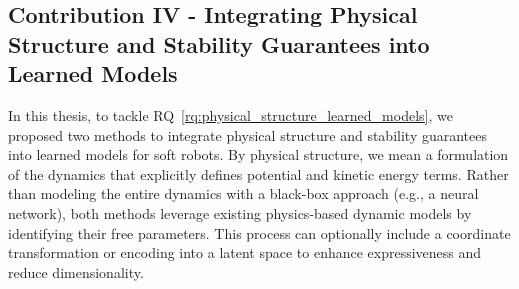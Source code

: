 \subsection{Contribution IV - Integrating Physical Structure and Stability Guarantees into Learned Models}
In this thesis, to tackle \gls{RQ}~\ref{rq:physical_structure_learned_models}, we proposed two methods to integrate physical structure and stability guarantees into learned models for soft robots. By physical structure, we mean a formulation of the dynamics that explicitly defines potential and kinetic energy terms. Rather than modeling the entire dynamics with a black-box approach (e.g., a neural network), both methods leverage existing physics-based dynamic models by identifying their free parameters. This process can optionally include a coordinate transformation or encoding into a latent space to enhance expressiveness and reduce dimensionality.

